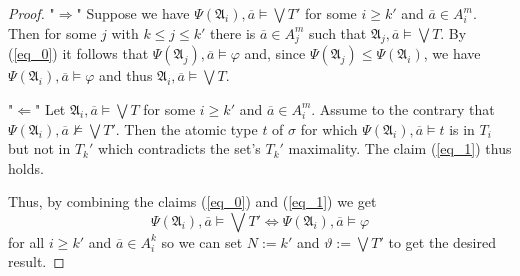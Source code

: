 \documentclass{ndjflart}
\theoremstyle{plain}
\theoremstyle{definition}
\numberwithin{equation}{section}
\begin{document}
\begin{proof}
"$\Rightarrow$" Suppose we have
$\Psi(\mathfrak{A}_i), \overline{a} \vDash \bigvee T'$ for some $i \geq k'$
and $\overline{a} \in A_i^m$.
Then for some $j$ with $k \leq j \leq k'$ there is $\overline{a} \in A_j^m$ such that
$\mathfrak{A}_j, \overline{a} \vDash \bigvee T$.
By (\ref{eq_0}) it follows that $\Psi(\mathfrak{A}_j), \overline{a} \vDash \varphi$
and, since $\Psi(\mathfrak{A}_j) \leq \Psi(\mathfrak{A}_i)$, we have
$\Psi(\mathfrak{A}_i), \overline{a} \vDash \varphi$ and thus
$\mathfrak{A}_i, \overline{a} \vDash \bigvee T$.

"$\Leftarrow$" Let $\mathfrak{A}_i, \overline{a} \vDash \bigvee T$
for some $i \geq k'$ and $\overline{a} \in A_i^m$.
Assume to the contrary that
$\Psi(\mathfrak{A}_i), \overline{a} \nvDash \bigvee T'$.
Then the atomic type $t$ of $\sigma$ for which
$\Psi(\mathfrak{A}_i), \overline{a} \vDash t$ is in $T_i$ but not in $T_k'$
which contradicts the set's $T_k'$ maximality.
The claim (\ref{eq_1}) thus holds.

Thus, by combining the claims (\ref{eq_0}) and (\ref{eq_1}) we get
\[
	\Psi(\mathfrak{A}_i), \overline{a} \vDash \bigvee T' \Leftrightarrow
	\Psi(\mathfrak{A}_i), \overline{a} \vDash \varphi
\]
for all $i \geq k'$ and $\overline{a} \in A_i^k$ so we can set
$N := k'$ and $\vartheta := \bigvee T'$ to get the desired result.
\end{proof}
\end{document}

